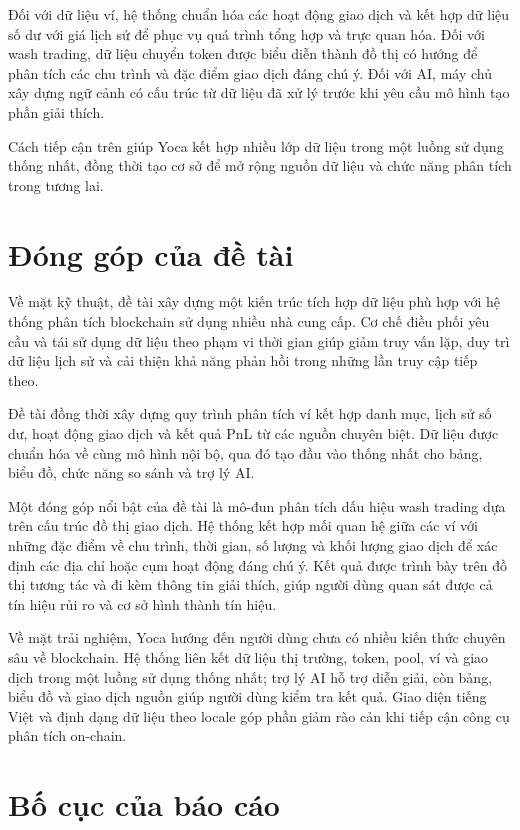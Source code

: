 Đối với dữ liệu ví, hệ thống chuẩn hóa các hoạt động giao dịch và kết hợp dữ liệu số dư với giá lịch sử để phục vụ quá trình tổng hợp và trực quan hóa. Đối với wash trading, dữ liệu chuyển token được biểu diễn thành đồ thị có hướng để phân tích các chu trình và đặc điểm giao dịch đáng chú ý. Đối với AI, máy chủ xây dựng ngữ cảnh có cấu trúc từ dữ liệu đã xử lý trước khi yêu cầu mô hình tạo phần giải thích.

Cách tiếp cận trên giúp Yoca kết hợp nhiều lớp dữ liệu trong một luồng sử dụng thống nhất, đồng thời tạo cơ sở để mở rộng nguồn dữ liệu và chức năng phân tích trong tương lai.

\section{Đóng góp của đề tài}
\label{sec:dong_gop}

Về mặt kỹ thuật, đề tài xây dựng một kiến trúc tích hợp dữ liệu phù hợp với hệ thống phân tích blockchain sử dụng nhiều nhà cung cấp. Cơ chế điều phối yêu cầu và tái sử dụng dữ liệu theo phạm vi thời gian giúp giảm truy vấn lặp, duy trì dữ liệu lịch sử và cải thiện khả năng phản hồi trong những lần truy cập tiếp theo.

Đề tài đồng thời xây dựng quy trình phân tích ví kết hợp danh mục, lịch sử số dư, hoạt động giao dịch và kết quả PnL từ các nguồn chuyên biệt. Dữ liệu được chuẩn hóa về cùng mô hình nội bộ, qua đó tạo đầu vào thống nhất cho bảng, biểu đồ, chức năng so sánh và trợ lý AI.

Một đóng góp nổi bật của đề tài là mô-đun phân tích dấu hiệu wash trading dựa trên cấu trúc đồ thị giao dịch. Hệ thống kết hợp mối quan hệ giữa các ví với những đặc điểm về chu trình, thời gian, số lượng và khối lượng giao dịch để xác định các địa chỉ hoặc cụm hoạt động đáng chú ý. Kết quả được trình bày trên đồ thị tương tác và đi kèm thông tin giải thích, giúp người dùng quan sát được cả tín hiệu rủi ro và cơ sở hình thành tín hiệu.

Về mặt trải nghiệm, Yoca hướng đến người dùng chưa có nhiều kiến thức chuyên sâu về blockchain. Hệ thống liên kết dữ liệu thị trường, token, pool, ví và giao dịch trong một luồng sử dụng thống nhất; trợ lý AI hỗ trợ diễn giải, còn bảng, biểu đồ và giao dịch nguồn giúp người dùng kiểm tra kết quả. Giao diện tiếng Việt và định dạng dữ liệu theo locale góp phần giảm rào cản khi tiếp cận công cụ phân tích on-chain.

\section{Bố cục của báo cáo}
\label{sec:bo_cuc}

